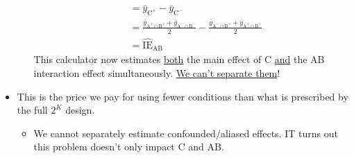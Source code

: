 \begin{itemize}
\begin{itemize}
\begin{align}
                         & =\bar{y}_{\text{C}^+}-\bar{y}_{\text{C}^-}                                                                                                                           \\
                         & =\frac{\bar{y}_{\text{A}^+\cap \text{B}^+}+\bar{y}_{\text{A}^-\cap \text{B}^-}}{2}-\frac{\bar{y}_{\text{A}^-\cap \text{B}^+}+\bar{y}_{\text{A}^+\cap \text{B}^-}}{2} \\
                         & =\widehat{\text{IE}}_{\text{AB}}
                    \end{align}
                    This calculator now estimates \underline{both} the main effect of C \underline{and} the AB interaction effect simultaneously. \underline{We can't separate them}!
          \end{itemize}
    \item This is the price we pay for using fewer conditions than what is prescribed by the full $2^K$ design.
          \begin{itemize}[$\hookrightarrow$]
              \item We cannot separately estimate confounded/aliased effects. IT turns out this problem doesn't only impact C and AB\@.
          \end{itemize}
\end{itemize}
